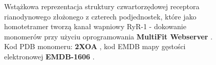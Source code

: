 \begin{figure}[h]
 \begin{center}
\end{center}
\caption[Receptor rianodynowy - struktura]{Wstążkowa reprezentacja struktury czwartorzędowej receptora rianodynowego złożonego z czterech podjednostek, które jako homotetramer tworzą kanał wapniowy RyR-1 - dokowanie monomerów przy użyciu oprogramowania \textbf{MultiFit Webserver} \cite{Tjioe2011}. Kod PDB monomeru: \textbf{2XOA} \cite{Tung2010}, kod EMDB mapy gęstości elektronowej \textbf{EMDB-1606} \cite{Samso2009}.}
\label{fig:ryr}
\end{figure}

